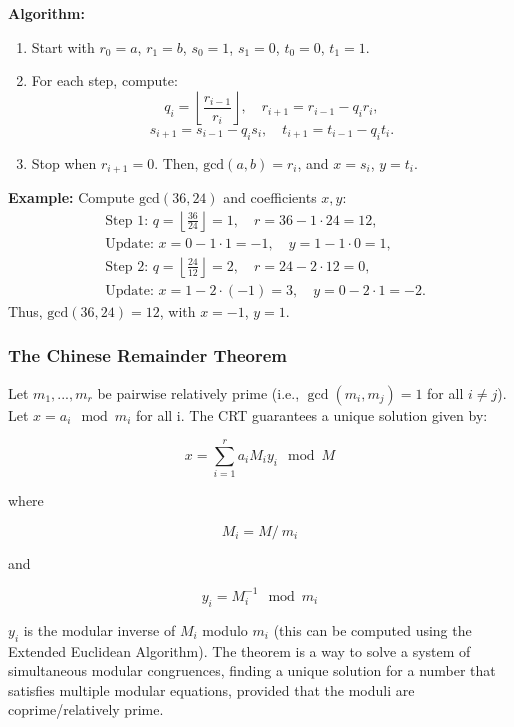 \textbf{Algorithm:}
\begin{enumerate}
    \item Start with \(r_0 = a\), \(r_1 = b\), \(s_0 = 1\), \(s_1 = 0\), \(t_0 = 0\), \(t_1 = 1\).
    \item For each step, compute:
    \[
    q_i = \left\lfloor \frac{r_{i-1}}{r_i} \right\rfloor, \quad r_{i+1} = r_{i-1} - q_i r_i,
    \]
    \[
    s_{i+1} = s_{i-1} - q_i s_i, \quad t_{i+1} = t_{i-1} - q_i t_i.
    \]
    \item Stop when \(r_{i+1} = 0\). Then, \(\text{gcd}(a, b) = r_i\), and \(x = s_i\), \(y = t_i\).
    
\end{enumerate}

\textbf{Example:}
Compute \(\text{gcd}(36, 24)\) and coefficients \(x, y\):
\[
\begin{aligned}
&\text{Step 1: } q = \left\lfloor \frac{36}{24} \right\rfloor = 1, \quad r = 36 - 1 \cdot 24 = 12, \\
&\text{Update: } x = 0 - 1 \cdot 1 = -1, \quad y = 1 - 1 \cdot 0 = 1, \\
&\text{Step 2: } q = \left\lfloor \frac{24}{12} \right\rfloor = 2, \quad r = 24 - 2 \cdot 12 = 0, \\
&\text{Update: } x = 1 - 2 \cdot (-1) = 3, \quad y = 0 - 2 \cdot 1 = -2.
\end{aligned}
\]
Thus, \(\text{gcd}(36, 24) = 12\), with \(x = -1\), \(y = 1\).

\subsubsection{The Chinese Remainder Theorem}
Let \(m_1, ..., m_r \) be pairwise relatively prime (i.e., \(\gcd(m_i, m_j) = 1\) for all \(i \neq j\)). Let \(x = a_i \mod m_i \) for all i. The CRT guarantees a unique solution given by:

\[ x = \sum^r_{i=1} a_iM_iy_i \mod M\] 

where

\[ M_i = M \slash \ m_i\]

and 

\[ y_i = M^{-1}_i \mod m_i \] 

$y_i$ is the modular inverse of $M_i$ modulo  $m_i$ (this can be computed using the Extended Euclidean Algorithm). The theorem is a way to solve a system of simultaneous modular congruences, finding a unique solution for a number that satisfies multiple modular equations, provided that the moduli are coprime/relatively prime. 

